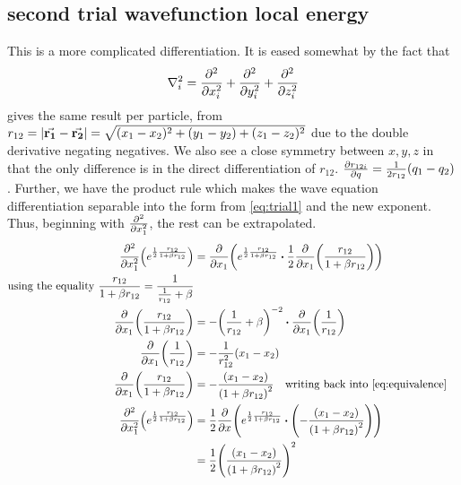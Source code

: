 \documentclass[10pt]{revtex4-1}
\begin{document}
\subsection{second trial wavefunction local energy}
This is a more complicated differentiation. It is eased somewhat by the fact that
\[ \nabla_i^2 = \pdv[2]{x_i} + \pdv[2]{y_i} + \pdv[2]{z_i} \]
gives the same result per particle, from $r_{12} = \qty| \va{r_1} - \va{r_2} | = \sqrt{ (x_1 - x_2)^2 + (y_1 - y_2) + (z_1 - z_2)^2 }$ due to the
double derivative negating negatives. We also see a close symmetry between $x, y, z$ in that the only difference is in the direct differentiation of
$r_{12}$. $\pdv{r_{12i}}{q} = \frac{1}{2r_{12}}(q_1 - q_2)$. Further, we have the product rule which makes the wave equation differentiation separable into
the form from \ref{eq:trial1} and the new exponent. Thus, beginning with $\pdv[2]{x_1}$, the rest can be extrapolated.
\begin{align}
    \pdv[2]{x_1} \qty( e^{\frac{1}{2}\frac{r_{12}}{1 + \beta r_{12}}})
        &= \pdv{x_1} \qty( e^{\frac{1}{2} \frac{r_{12}}{1 + \beta r_{12}}} \vdot \frac{1}{2}\pdv{x_1}\qty( \frac{r_{12}}{1 + \beta r_{12}} ) )\nonumber \\
    \text{using the equality } \frac{r_{12}}{1 + \beta r_{12} } = \frac{1}{\frac{1}{r_{12}} + \beta } \label{eq:equivalence} \\
    \pdv{x_1} \qty( \frac{r_{12}}{1 + \beta r_{12}} )
        &= -\qty( \frac{1}{r_{12}} + \beta )^{-2} \vdot \pdv{x_1} \qty( \frac{1}{r_{12}} ) \nonumber\\
    \pdv{x_1}\qty( \frac{1}{r_{12}} ) &= -\frac{1}{r_{12}^2}(x_1 - x_2)\nonumber \\
    \pdv{x_1} \qty( \frac{r_{12}}{1 + \beta r_{12}} )
        &= - \frac{(x_1 - x_2)}{\qty( 1 + \beta r_{12} )^2} \qq{writing back into \ref{eq:equivalence}} \nonumber \\
    \pdv[2]{x_1} \qty( e^{\frac{1}{2}\frac{r_{12}}{1 + \beta r_{12}}})
        &= \frac{1}{2} \pdv{x} \qty( e^{\frac{1}{2} \frac{r_{12}}{1 + \beta r_{12}}} \vdot \qty( - \frac{(x_1 - x_2)}{\qty( 1 + \beta r_{12} )^2} ) ) \nonumber\\
        &= \frac{1}{2} \qty(\frac{(x_1 - x_2)}{\qty( 1 + \beta r_{12} )^2})^2
\end{align}
\end{document}
